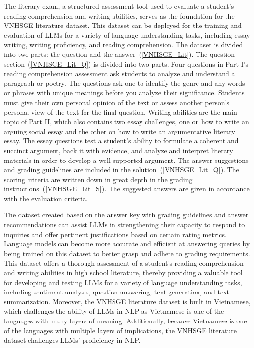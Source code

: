 \documentclass{article}
\begin{document}
{	The literary exam, a structured assessment tool used to evaluate a student's reading comprehension and writing abilities, serves as the foundation for the VNHSGE literature dataset. This dataset can be deployed for the training and evaluation of LLMs for a variety of language understanding tasks, including essay writing, writing proficiency, and reading comprehension. The dataset is divided into two parts: the question and the answer~(\ref{VNHSGE_Lit}). The question section~(\ref{VNHSGE_Lit_Q}) is divided into two parts. Four questions in Part I's reading comprehension assessment ask students to analyze and understand a paragraph or poetry. The questions ask one to identify the genre and any words or phrases with unique meanings before you analyze their significance. Students must give their own personal opinion of the text or assess another person's personal view of the text for the final question. Writing abilities are the main topic of Part II, which also contains two essay challenges, one on how to write an arguing social essay and the other on how to write an argumentative literary essay. The essay questions test a student's ability to formulate a coherent and succinct argument, back it with evidence, and analyze and interpret literary materials in order to develop a well-supported argument. The answer suggestions and grading guidelines are included in the solution~(\ref{VNHSGE_Lit_Q}). The scoring criteria are written down in great depth in the grading instructions~(\ref{VNHSGE_Lit_S}). The suggested answers are given in accordance with the evaluation criteria.
	
	The dataset created based on the answer key with grading guidelines and answer recommendations can assist LLMs in strengthening their capacity to respond to inquiries and offer pertinent justifications based on certain rating metrics. Language models can become more accurate and efficient at answering queries by being trained on this dataset to better grasp and adhere to grading requirements. This dataset offers a thorough assessment of a student's reading comprehension and writing abilities in high school literature, thereby providing a valuable tool for developing and testing LLMs for a variety of language understanding tasks, including sentiment analysis, question answering, text generation, and text summarization. Moreover, the VNHSGE literature dataset is built in Vietnamese, which challenges the ability of LLMs in NLP as Vietnamese is one of the languages with many layers of meaning. Additionally, because Vietnamese is one of the languages with multiple layers of implications, the VNHSGE literature dataset challenges LLMs' proficiency in NLP.
	
}
\end{document}

